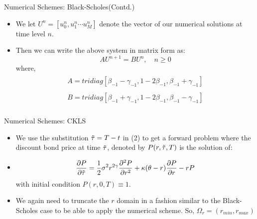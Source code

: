 \documentclass{beamer}
\begin{document}
\begin{frame}{Numerical Schemes: Black-Scholes(Contd.)}
\begin{itemize}
    \item We let $U^{n} = [u_{0}^{n}, u_{1}^{n} \cdots u_{M}^{n}]$ denote the vector of our numerical solutions at time level $n$.
 
\item Then we can write the above system in matrix form as:
\begin{equation*}
    AU^{n+1} = BU^{n}, \quad n \ge 0
\end{equation*}
where, 
\begin{align*}
    \begin{split}
        A = tridiag[\beta_{-1}-\gamma_{-1}, 1-2\beta_{-1}, \beta_{-1}+\gamma_{-1}]
    \end{split}\\
    \begin{split}
        B = tridiag[\beta_{-1}+\gamma_{-1}, 1-2\beta_{-1}, \beta_{-1}-\gamma_{-1}]
    \end{split}\\
\end{align*}
\end{itemize}
 
\end{frame}
 
\begin{frame}{Numerical Schemes: CKLS }
\begin{itemize}
    \item We use the substitution $\Tilde{\tau} = T-t$ in (2) to get a forward problem where the discount bond price at time $\Tilde{\tau}$, denoted by $P(r,\Tilde{\tau}, T)$ is the solution of:
 
\item \begin{equation*}
    \frac{\partial P}{\partial \Tilde{\tau}} = \frac{1}{2} \sigma^{2}r^{2\gamma}\frac{\partial^{2}P}{\partial r^{2}} + \kappa(\theta-r)\frac{\partial P}{\partial r} - rP
\end{equation*}
 with initial condition $P(r,0,T)\equiv 1$. 
 \item  We again need to truncate the $r$ domain in a fashion similar to the Black-Scholes case to be able to apply the numerical scheme. So, $\Omega_{r} = (r_{min}, r_{max})$
 
\end{itemize}
 
\end{frame}
 
\end{document}
